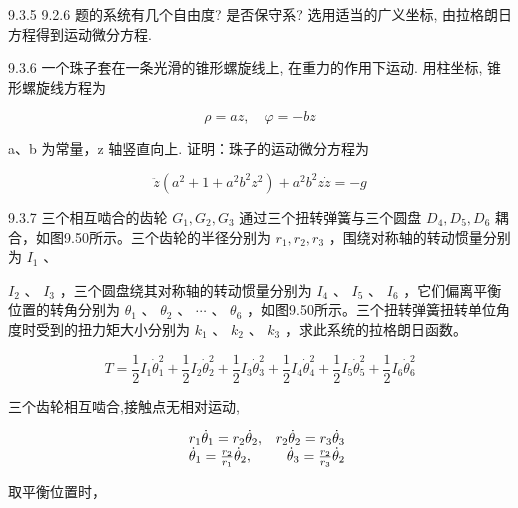 \begin{problem}{9.3.5}
9.2.6 题的系统有几个自由度? 是否保守系? 选用适当的广义坐标, 由拉格朗日方程得到运动微分方程.
\end{problem}
\clearpage


\begin{problem}{9.3.6}
一个珠子套在一条光滑的锥形螺旋线上, 在重力的作用下运动. 用柱坐标, 锥形螺旋线方程为

\[
\rho = a z, \quad \varphi = - b z
\]

a、b 为常量，z 轴竖直向上. 证明：珠子的运动微分方程为

\[
\ddot {z} \left(a ^ {2} + 1 + a ^ {2} b ^ {2} z ^ {2}\right) + a ^ {2} b ^ {2} z \dot {z} = - g
\]
\end{problem}
\clearpage


\begin{problem}{9.3.7}
三个相互啮合的齿轮 $G_{1}, G_{2}, G_{3}$ 通过三个扭转弹簧与三个圆盘 $D_{4}, D_{5}, D_{6}$ 耦合，如图9.50所示。三个齿轮的半径分别为 $r_{1}, r_{2}, r_{3}$ ，围绕对称轴的转动惯量分别为 $I_{1}$ 、

$I_{2}$ 、 $I_{3}$ ，三个圆盘绕其对称轴的转动惯量分别为 $I_{4}$ 、 $I_{5}$ 、 $I_{6}$ ，它们偏离平衡位置的转角分别为 $\theta_{1}$ 、 $\theta_{2}$ 、 $\cdots$ 、 $\theta_{6}$ ，如图9.50所示。三个扭转弹簧扭转单位角度时受到的扭力矩大小分别为 $k_{1}$ 、 $k_{2}$ 、 $k_{3}$ ，求此系统的拉格朗日函数。

\[
T = \frac {1}{2} I _ {1} \dot {\theta} _ {1} ^ {2} + \frac {1}{2} I _ {2} \dot {\theta} _ {2} ^ {2} + \frac {1}{2} I _ {3} \dot {\theta} _ {3} ^ {2} + \frac {1}{2} I _ {4} \dot {\theta} _ {4} ^ {2} + \frac {1}{2} I _ {5} \dot {\theta} _ {5} ^ {2} + \frac {1}{2} I _ {6} \dot {\theta} _ {6} ^ {2}
\]

三个齿轮相互啮合,接触点无相对运动,

\[
\begin{array}{r l r} & {r _ {1} \dot {\theta} _ {1} = r _ {2} \dot {\theta} _ {2},} & {r _ {2} \dot {\theta} _ {2} = r _ {3} \dot {\theta} _ {3}} \\ & {\dot {\theta} _ {1} = \frac {r _ {2}}{r _ {1}} \dot {\theta} _ {2},} & {\dot {\theta} _ {3} = \frac {r _ {2}}{r _ {3}} \dot {\theta} _ {2}} \end{array}
\]

取平衡位置时，


\end{problem}
